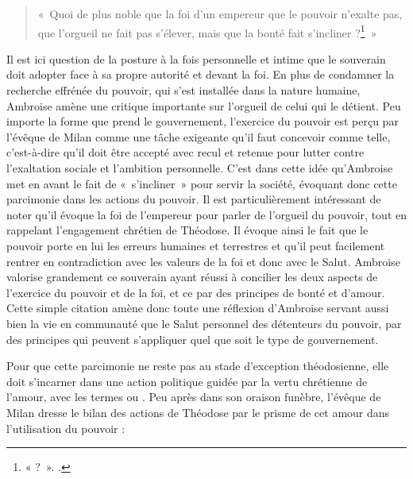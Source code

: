 \bigskip

\begin{quote}
    «~Quoi de plus noble que la foi d’un empereur que le pouvoir n’exalte pas, que l'orgueil ne fait pas s’élever, mais que la bonté fait s’incliner ?\footnote{« ?~». \cite[]{ambroise_mort_theodose}.}~»
\end{quote}

\bigskip

Il est ici question de la posture à la fois personnelle et intime que le souverain doit adopter face à sa propre autorité et devant la foi. En plus de condamner la recherche effrénée du pouvoir, qui s'est installée dans la nature humaine, Ambroise amène une critique importante sur l'orgueil de celui qui le détient. Peu importe la forme que prend le gouvernement, l'exercice du pouvoir est perçu par l'évêque de Milan comme une tâche exigeante qu'il faut concevoir comme telle, c'est-à-dire qu'il doit être accepté avec recul et retenue pour lutter contre l'exaltation sociale et l'ambition personnelle. C'est dans cette idée qu'Ambroise met en avant le fait de «~s’incliner~» pour servir la société, évoquant donc cette parcimonie dans les actions du pouvoir. Il est particulièrement intéressant de noter qu'il évoque la foi de l'empereur pour parler de l'orgueil du pouvoir, tout en rappelant l'engagement chrétien de Théodose. Il évoque ainsi le fait que le pouvoir porte en lui les erreurs humaines et terrestres et qu'il peut facilement rentrer en contradiction avec les valeurs de la foi et donc avec le Salut. Ambroise valorise grandement ce souverain ayant réussi à concilier les deux aspects de l'exercice du pouvoir et de la foi, et ce par des principes de bonté et d'amour. Cette simple citation amène donc toute une réflexion d'Ambroise servant aussi bien la vie en communauté que le Salut personnel des détenteurs du pouvoir, par des principes qui peuvent s'appliquer quel que soit le type de gouvernement.

\bigskip

Pour que cette parcimonie ne reste pas au stade d'exception théodosienne, elle doit s'incarner dans une action politique guidée par la vertu chrétienne de l'amour, avec les termes  ou . Peu après dans son oraison funèbre, l'évêque de Milan dresse le bilan des actions de Théodose par le prisme de cet amour dans l'utilisation du pouvoir :

\bigskip

